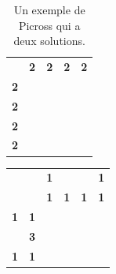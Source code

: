 \documentclass{article}
\begin{document}
\begin{table}[h]
\centering
\begin{tabular}{ccccc}
\textbf{}                       & \textbf{2}                                    & \textbf{2}                                    & \textbf{2}                                    & \textbf{2}                                    \\ \cline{2-5} 
\multicolumn{1}{c|}{\textbf{2}} & \multicolumn{1}{c|}{\cellcolor[HTML]{000000}} & \multicolumn{1}{c|}{\cellcolor[HTML]{000000}} & \multicolumn{1}{c|}{}                         & \multicolumn{1}{c|}{}                         \\ \cline{2-5} 
\multicolumn{1}{c|}{\textbf{2}} & \multicolumn{1}{c|}{\cellcolor[HTML]{000000}} & \multicolumn{1}{c|}{\cellcolor[HTML]{000000}} & \multicolumn{1}{c|}{}                         & \multicolumn{1}{c|}{}                         \\ \cline{2-5} 
\multicolumn{1}{c|}{\textbf{2}} & \multicolumn{1}{c|}{}                         & \multicolumn{1}{c|}{}                         & \multicolumn{1}{c|}{\cellcolor[HTML]{000000}} & \multicolumn{1}{c|}{\cellcolor[HTML]{000000}} \\ \cline{2-5} 
\multicolumn{1}{l|}{\textbf{2}} & \multicolumn{1}{l|}{}                         & \multicolumn{1}{l|}{}                         & \multicolumn{1}{l|}{\cellcolor[HTML]{000000}} & \multicolumn{1}{l|}{\cellcolor[HTML]{000000}} \\ \cline{2-5} 
\end{tabular}
\caption{Un exemple de Picross qui a deux solutions.}
\end{table}

\begin{table}[h]
\centering
\begin{tabular}{cccccc}
                   &                                 & \textbf{1}            & \textbf{}             & \textbf{}             & \textbf{1}            \\
                   & \textbf{}                       & \textbf{1}            & \textbf{1}            & \textbf{1}            & \textbf{1}            \\ \cline{3-6} 
\textbf{1}         & \multicolumn{1}{c|}{\textbf{1}} & \multicolumn{1}{c|}{} & \multicolumn{1}{c|}{} & \multicolumn{1}{c|}{} & \multicolumn{1}{c|}{} \\ \cline{3-6} 
\textit{\textbf{}} & \multicolumn{1}{c|}{\textbf{3}} & \multicolumn{1}{c|}{} & \multicolumn{1}{c|}{} & \multicolumn{1}{c|}{} & \multicolumn{1}{c|}{} \\ \cline{3-6} 
\textbf{1}         & \multicolumn{1}{c|}{\textbf{1}} & \multicolumn{1}{c|}{} & \multicolumn{1}{c|}{} & \multicolumn{1}{c|}{} & \multicolumn{1}{c|}{} \\ \cline{3-6} 
\end{tabular}
\end{table}
\end{document}
